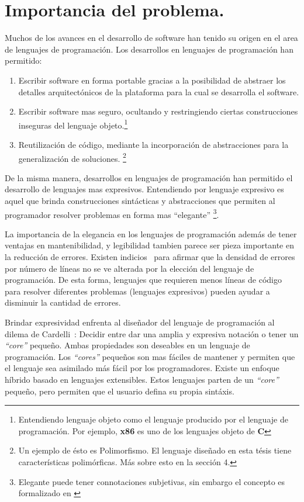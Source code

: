 \chapter{Importancia del problema.}

Muchos de los avances en el desarrollo de software han tenido su origen en el area de
lenguajes de programación. Los desarrollos en lenguajes de programación han
permitido:

\begin{enumerate}
\item Escribir software en forma portable gracias a la posibilidad de abstraer los
  detalles arquitectónicos de la plataforma para la cual se desarrolla el software.
\item Escribir software mas seguro, ocultando y restringiendo ciertas construcciones
  inseguras del lenguaje objeto.\footnote{Entendiendo lenguaje objeto como el lenguaje
    producido por el lenguaje de programación. Por ejemplo, \textbf{x86} es uno de
    los lenguajes objeto de \textbf{C}}
\item Reutilización de código, mediante la incorporación de abstracciones para la
  generalización de soluciones. \footnote{Un ejemplo de ésto es Polimorfismo. El
    lenguaje diseñado en esta tésis tiene características polimórficas. Más sobre
    esto en la sección 4.}
\end{enumerate}

De la misma manera, desarrollos en lenguajes de programación han permitido el
desarrollo de lenguajes mas expresivos. Entendiendo por lenguaje expresivo es aquel
que brinda construcciones sintácticas y abstracciones que permiten al programador
resolver problemas en forma mas ``elegante''
\footnote{Elegante puede tener connotaciones subjetivas, sin embargo el concepto es
  formalizado en \cite{Chaitin:ElegantLisp}}.

La importancia de la elegancia en los lenguajes de programación además de tener
ventajas en mantenibilidad, y legibilidad tambien parece ser pieza importante en la
reducción de errores. Existen indicios~\cite{ulf:4fold} para afirmar que la
densidad de errores por número de líneas no se ve alterada por la elección del
lenguaje de programación. De esta forma, lenguajes que requieren menos líneas de
código para resolver diferentes problemas (lenguajes expresivos) pueden ayudar a 
disminuir la cantidad de errores. 

Brindar expresividad enfrenta al diseñador del lenguaje de programación al dilema de
Cardelli~\cite{cardelli:extensiblesyntax}: Decidir entre dar una amplia y expresiva
notación o tener un \textit{``core''} pequeño. Ambas propiedades son deseables en un
lenguaje de programación. Los \textit{``cores''} pequeños son mas fáciles de mantener
y permiten que el lenguaje sea asimilado más fácil por los programadores. Existe un
enfoque híbrido basado en lenguajes extensibles. Estos lenguajes parten de un
\textit{``core''} pequeño, pero permiten que el usuario defina su propia sintáxis. 

